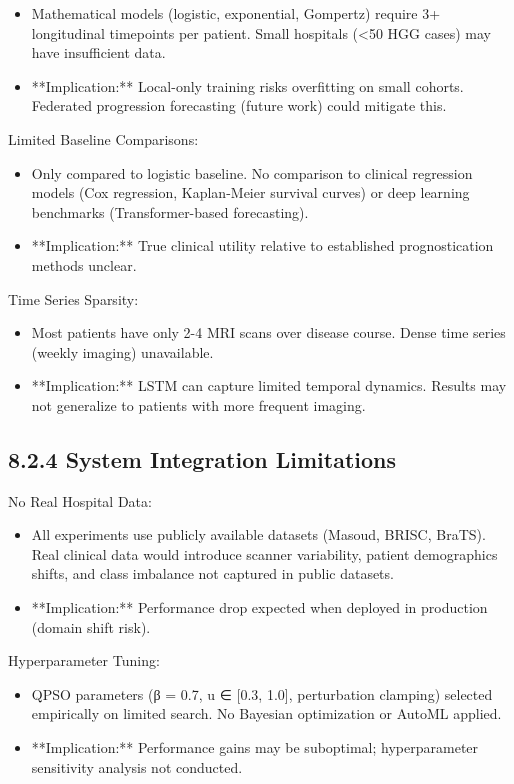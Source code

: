 \begin{itemize}
  \item Mathematical models (logistic, exponential, Gompertz) require 3+ longitudinal timepoints per patient. Small hospitals (<50 HGG cases) may have insufficient data.
  \item **Implication:** Local-only training risks overfitting on small cohorts. Federated progression forecasting (future work) could mitigate this.
\end{itemize}

Limited Baseline Comparisons:

\begin{itemize}
  \item Only compared to logistic baseline. No comparison to clinical regression models (Cox regression, Kaplan-Meier survival curves) or deep learning benchmarks (Transformer-based forecasting).
  \item **Implication:** True clinical utility relative to established prognostication methods unclear.
\end{itemize}

Time Series Sparsity:

\begin{itemize}
  \item Most patients have only 2-4 MRI scans over disease course. Dense time series (weekly imaging) unavailable.
  \item **Implication:** LSTM can capture limited temporal dynamics. Results may not generalize to patients with more frequent imaging.
\end{itemize}


\subsection{8.2.4 System Integration Limitations}
No Real Hospital Data:

\begin{itemize}
  \item All experiments use publicly available datasets (Masoud, BRISC, BraTS). Real clinical data would introduce scanner variability, patient demographics shifts, and class imbalance not captured in public datasets.
  \item **Implication:** Performance drop expected when deployed in production (domain shift risk).
\end{itemize}

Hyperparameter Tuning:

\begin{itemize}
  \item QPSO parameters (β = 0.7, u ∈ [0.3, 1.0], perturbation clamping) selected empirically on limited search. No Bayesian optimization or AutoML applied.
  \item **Implication:** Performance gains may be suboptimal; hyperparameter sensitivity analysis not conducted.
\end{itemize}

